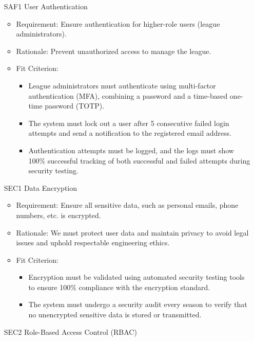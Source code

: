 \documentclass{article}
\begin{document}
\begin{enumerate}
    \item[SAF1] User Authentication
          \begin{itemize}
              \item Requirement: Ensure authentication for higher-role users (league administrators).
              \item Rationale: Prevent unauthorized access to manage the league.
              \item Fit Criterion:
                    \begin{itemize}
                        \item League administrators must authenticate using multi-factor authentication (MFA), combining a password and a time-based one-time password (TOTP).
                        \item The system must lock out a user after 5 consecutive failed login attempts and send a notification to the registered email address.
                        \item Authentication attempts must be logged, and the logs must show 100\% successful tracking of both successful and failed attempts during security testing.
                    \end{itemize}
          \end{itemize}
    \item[SEC1] Data Encryption
          \begin{itemize}
              \item Requirement: Ensure all sensitive data, such as personal emails, phone numbers, etc. is encrypted.
              \item Rationale: We must protect user data and maintain privacy to avoid legal issues and uphold respectable engineering ethics.
              \item Fit Criterion:
                    \begin{itemize}
                        \item Encryption must be validated using automated security testing tools to ensure 100\% compliance with the encryption standard.
                        \item The system must undergo a security audit every season to verify that no unencrypted sensitive data is stored or transmitted.
                    \end{itemize}
          \end{itemize}
    \item[SEC2] Role-Based Access Control (RBAC)

\end{enumerate}
\end{document}
